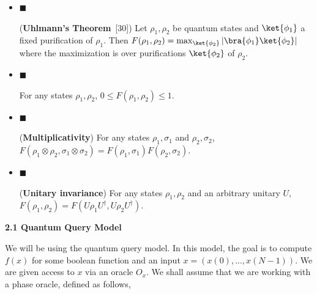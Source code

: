 \begin{itemize}


\item[] 
$\blacksquare$ 


(\textbf{Uhlmann’s Theorem} [30]) Let $\rho_{1},\rho_{2}$ be quantum states and $\ket{\phi_{1}}$ a fixed purification of $\rho_{1}$. Then $F(\rho_{1},\rho_{2})=\max_{\ket{\phi_{2}}}\left|\bra{\phi_{1}}\ket{\phi_{2}}\right|$ where the maximization is over purifications $\ket{\phi_{2}}$ of $\rho_{2}$.\par





\item[] 
$\blacksquare$ 


For any states $\rho_{1},\rho_{2}$, $0\leq F(\rho_{1},\rho_{2})\leq 1$.\par





\item[] 
$\blacksquare$ 


(\textbf{Multiplicativity}) For any states $\rho_{1},\sigma_{1}$ and $\rho_{2},\sigma_{2}$, $F(\rho_{1}\otimes\rho_{2},\sigma_{1}\otimes\sigma_{2})=F(\rho_{1},\sigma_{1})F(\rho_{2},\sigma_{2})$.\par





\item[] 
$\blacksquare$ 


(\textbf{Unitary invariance}) For any states $\rho_{1},\rho_{2}$ and an arbitrary unitary $U$, $F(\rho_{1},\rho_{2})=F(U\rho_{1}U^{\dagger},U\rho_{2}U^{\dagger})$.\par





\end{itemize}




\par\medskip\noindent\textbf{
2.1 Quantum Query Model}\par




We will be using the quantum query model. In this model, the goal is to compute $f(x)$ for some boolean function and an input $x=(x(0),...,x(N-1))$. We are given access to $x$ via an oracle $O_{x}$. We shall assume that we are working with a phase oracle, defined as follows,\par


